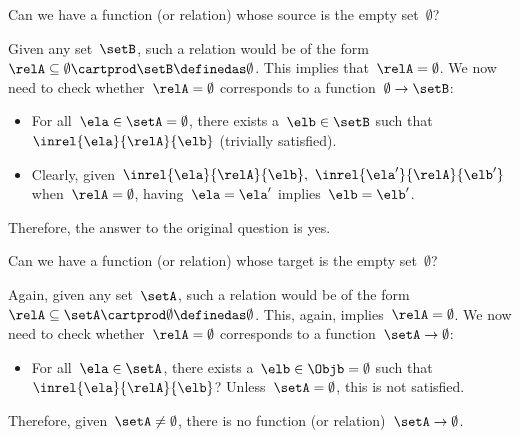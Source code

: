 \begin{exercise}
	Can we have a function (or relation) whose source is the empty set~$\emptyset$?
\end{exercise}
\begin{solution}
	Given any set~$\setB$, such a relation would be of the form~$\relA \subseteq \emptyset \cartprod \setB \definedas \emptyset$.
	This implies that~$\relA=\emptyset$.
	We now need to check whether~$\relA=\emptyset$ corresponds to a function~$\emptyset\to \setB$:
	\begin{itemize}
		\item For all~$\ela\in \setA=\emptyset$, there exists a~$\elb \in \setB$ such that $\inrel{\ela}{\relA}{\elb}$ (trivially satisfied).
		\item Clearly, given~$\inrel{\ela}{\relA}{\elb},~\inrel{\ela'}{\relA}{\elb'}$ when~$\relA=\emptyset$, having~$\ela=\ela'$ implies~$\elb=\elb'$.
	\end{itemize}
	Therefore, the answer to the original question is yes.
\end{solution}

\begin{exercise}
	Can we have a function (or relation) whose target is the empty set~$\emptyset$?
\end{exercise}
\begin{solution}
	Again, given any set~$\setA$, such a relation would be of the form~$\relA \subseteq \setA \cartprod \emptyset\definedas \emptyset$.
	This, again, implies~$\relA=\emptyset$.
	We now need to check whether~$\relA=\emptyset$ corresponds to a function~$\setA \to \emptyset$:
	\begin{itemize}
		\item For all~$\ela\in \setA$, there exists a~$\elb\in \Objb=\emptyset$ such that~$\inrel{\ela}{\relA}{\elb}$?
		      Unless~$\setA=\emptyset$, this is not satisfied.
	\end{itemize}
	Therefore, given~$\setA \neq \emptyset$, there is no function (or relation)~$\setA \to \emptyset$.
\end{solution}
